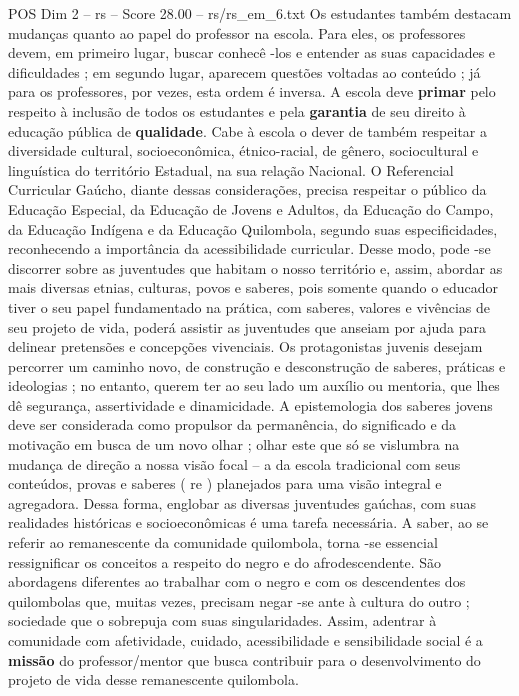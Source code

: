 \begin{textsample}{POS Dim 2 – rs – Score 28.00 – rs/rs\_em\_6.txt}
Os estudantes também destacam mudanças quanto ao papel do professor na escola.
Para eles, os professores devem, em primeiro lugar, buscar conhecê -los e entender as suas capacidades e dificuldades ; em segundo lugar, aparecem questões voltadas ao conteúdo ; já para os professores, por vezes, esta ordem é inversa.
A escola deve \textbf{primar} pelo respeito à inclusão de todos os estudantes e pela \textbf{garantia} de seu direito à educação pública de \textbf{qualidade}.
Cabe à escola o dever de também respeitar a diversidade cultural, socioeconômica, étnico-racial, de gênero, sociocultural e linguística do território Estadual, na sua relação Nacional.
O Referencial Curricular Gaúcho, diante dessas considerações, precisa respeitar o público da Educação Especial, da Educação de Jovens e Adultos, da Educação do Campo, da Educação Indígena e da Educação Quilombola, segundo suas especificidades, reconhecendo a importância da acessibilidade curricular.
Desse modo, pode -se discorrer sobre as juventudes que habitam o nosso território e, assim, abordar as mais diversas etnias, culturas, povos e saberes, pois somente quando o educador tiver o seu papel fundamentado na prática, com saberes, valores e vivências de seu projeto de vida, poderá assistir as juventudes que anseiam por ajuda para delinear pretensões e concepções vivenciais.
Os protagonistas juvenis desejam percorrer um caminho novo, de construção e desconstrução de saberes, práticas e ideologias ; no entanto, querem ter ao seu lado um auxílio ou mentoria, que lhes dê segurança, assertividade e dinamicidade.
A epistemologia dos saberes jovens deve ser considerada como propulsor da permanência, do significado e da motivação em busca de um novo olhar ; olhar este que só se vislumbra na mudança de direção a nossa visão focal – a da escola tradicional com seus conteúdos, provas e saberes ( re ) planejados para uma visão integral e agregadora.
Dessa forma, englobar as diversas juventudes gaúchas, com suas realidades históricas e socioeconômicas é uma tarefa necessária.
A saber, ao se referir ao remanescente da comunidade quilombola, torna -se essencial ressignificar os conceitos a respeito do negro e do afrodescendente.
São abordagens diferentes ao trabalhar com o negro e com os descendentes dos quilombolas que, muitas vezes, precisam negar -se ante à cultura do outro ; sociedade que o sobrepuja com suas singularidades.
Assim, adentrar à comunidade com afetividade, cuidado, acessibilidade e sensibilidade social é a \textbf{missão} do professor/mentor que busca contribuir para o desenvolvimento do projeto de vida desse remanescente quilombola.

\end{textsample}
